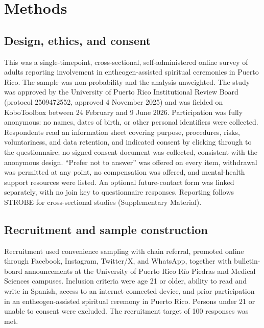 \documentclass[12pt]{article}
\begin{document}
\section{Methods}

\subsection{Design, ethics, and consent}

This was a single-timepoint, cross-sectional, self-administered online survey of adults reporting
involvement in entheogen-assisted spiritual ceremonies in Puerto Rico. The sample was non-probability and
the analysis unweighted. The study was approved by the University of Puerto Rico Institutional Review Board
(protocol 2509472552, approved 4 November 2025) and was fielded on KoboToolbox between 24 February and 9
June 2026. Participation was fully anonymous: no names, dates of birth, or other personal identifiers were
collected. Respondents read an information sheet covering purpose, procedures, risks, voluntariness, and
data retention, and indicated consent by clicking through to the questionnaire; no signed consent document
was collected, consistent with the anonymous design. ``Prefer not to answer'' was offered on every item,
withdrawal was permitted at any point, no compensation was offered, and mental-health support resources
were listed. An optional future-contact form was linked separately, with no join key to questionnaire
responses. Reporting follows STROBE for cross-sectional studies (Supplementary Material).

\subsection{Recruitment and sample construction}

Recruitment used convenience sampling with chain referral, promoted online through Facebook, Instagram,
Twitter/X, and WhatsApp, together with bulletin-board announcements at the University of Puerto Rico R\'io
Piedras and Medical Sciences campuses. Inclusion criteria were age 21 or older, ability to read and write
in Spanish, access to an internet-connected device, and prior participation in an entheogen-assisted
spiritual ceremony in Puerto Rico. Persons under 21 or unable to consent were excluded. The recruitment
target of 100 responses was met.
\end{document}
